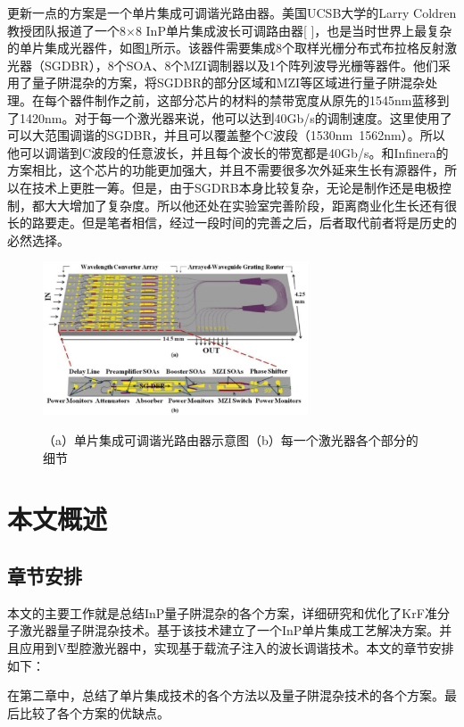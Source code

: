 \documentclass{ZJUthesis}
\begin{document}
更新一点的方案是一个单片集成可调谐光路由器。美国UCSB大学的Larry Coldren教授团队报道了一个8×8 InP单片集成波长可调路由器[ ]，也是当时世界上最复杂的单片集成光器件，如图\ref{fig_motor}所示。该器件需要集成8个取样光栅分布式布拉格反射激光器（SGDBR），8个SOA、8个MZI调制器以及1个阵列波导光栅等器件。他们采用了量子阱混杂的方案，将SGDBR的部分区域和MZI等区域进行量子阱混杂处理。在每个器件制作之前，这部分芯片的材料的禁带宽度从原先的1545nm蓝移到了1420nm。对于每一个激光器来说，他可以达到40Gb/s的调制速度。这里使用了可以大范围调谐的SGDBR，并且可以覆盖整个C波段（1530nm~1562nm）。所以他可以调谐到C波段的任意波长，并且每个波长的带宽都是40Gb/s。和Infinera的方案相比，这个芯片的功能更加强大，并且不需要很多次外延来生长有源器件，所以在技术上更胜一筹。但是，由于SGDRB本身比较复杂，无论是制作还是电极控制，都大大增加了复杂度。所以他还处在实验室完善阶段，距离商业化生长还有很长的路要走。但是笔者相信，经过一段时间的完善之后，后者取代前者将是历史的必然选择。

\begin{figure}[!ht]
  \centering
  \includegraphics[width=0.7\textwidth]{./Pictures/motor.eps}\\
  \caption{（a）单片集成可调谐光路由器示意图（b）每一个激光器各个部分的细节}
  \label{fig_motor}
\end{figure}

\section{本文概述}

\subsection{章节安排}
本文的主要工作就是总结InP量子阱混杂的各个方案，详细研究和优化了KrF准分子激光器量子阱混杂技术。基于该技术建立了一个InP单片集成工艺解决方案。并且应用到V型腔激光器中，实现基于载流子注入的波长调谐技术。本文的章节安排如下：

在第二章中，总结了单片集成技术的各个方法以及量子阱混杂技术的各个方案。最后比较了各个方案的优缺点。
\end{document}
